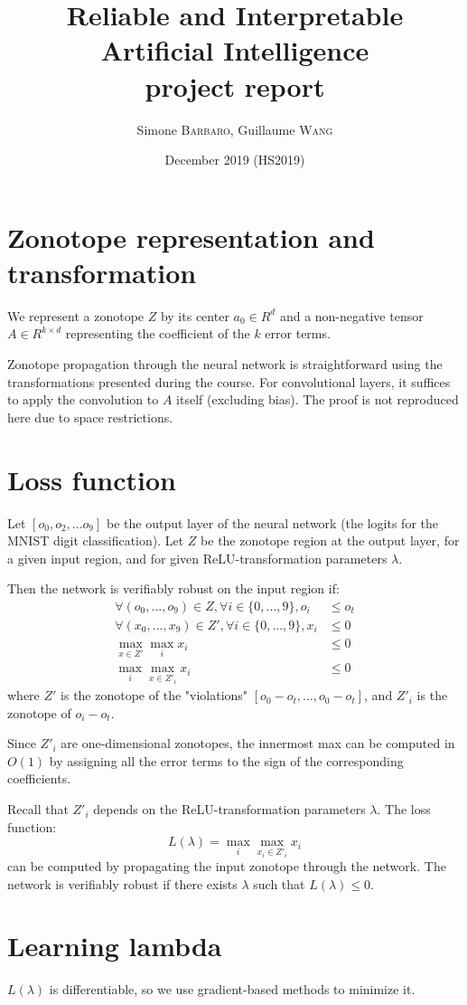 \documentclass{article}
\title{Reliable and Interpretable Artificial Intelligence \\ project report}
\author{Simone \textsc{Barbaro}, Guillaume \textsc{Wang}}
\date{December 2019 (HS2019)}
\begin{document}
\maketitle

\section{Zonotope representation and transformation}

We represent a zonotope $Z$ by its center $a_0 \in R^d$ and a non-negative tensor $A \in R^{k \times d}$ representing the coefficient of the $k$ error terms.

Zonotope propagation through the neural network is straightforward using the transformations presented during the course.
For convolutional layers, it suffices to apply the convolution to $A$ itself (excluding bias).
The proof is not reproduced here due to space restrictions.

\section{Loss function}

Let $[o_0, o_2, ... o_9]$ be the output layer of the neural network (the logits for the MNIST digit classification). 
Let $Z$ be the zonotope region at the output layer, for a given input region, and for given ReLU-transformation parameters $\lambda$.

Then the network is verifiably robust on the input region if:
\begin{align*}
    \forall (o_0, ..., o_9) \in Z, \forall i \in \{0, ..., 9\}, o_i &\leq o_t \\
    \forall (x_0, ..., x_9) \in Z', \forall i \in \{0, ..., 9\}, x_i &\leq 0 \\
    \max_{x \in Z'} \max_i x_i &\leq 0 \\
    \max_i \max_{x \in Z'_i} x_i &\leq 0
\end{align*}
where $Z'$ is the zonotope of the "violations" $[o_0 - o_t, ..., o_0 - o_t]$, and $Z'_i$ is the zonotope of $o_i - o_t$.

Since $Z'_i$ are one-dimensional zonotopes, the innermost max can be computed in $O(1)$ by assigning all the error terms to the sign of the corresponding coefficients.

Recall that $Z'_i$ depends on the ReLU-transformation parameters $\lambda$. The loss function:
\begin{equation*}
    L(\lambda) = \max_i \max_{x_i \in Z'_i} x_i
\end{equation*}
can be computed by propagating the input zonotope through the network.
The network is verifiably robust if there exists $\lambda$ such that $L(\lambda) \leq 0$.

\section{Learning lambda}

$L(\lambda)$ is differentiable, so we use gradient-based methods to minimize it.
\end{document}
